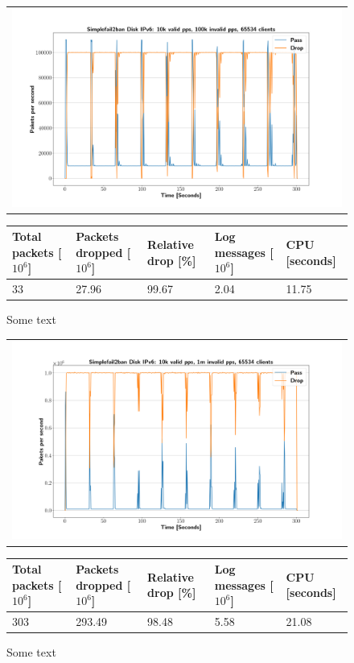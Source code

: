 \begin{figure}[p]
	\label{fig:simplefail2ban:disk:ip6:100k}
	\centering
	\scriptsize
	\begin{tabular}{c}
    	\centerline{\includegraphics[width=1.2\textwidth]{images/simplefail2ban_disk_ipv6_v10k_iv100k_c65534.png}}
	\end{tabular}
	\begin{tabular}{lllll}
		\toprule
		\textbf{Total packets [$10^6$]} & \textbf{Packets dropped [$10^6$]} & \textbf{Relative drop [\%]} & \textbf{Log messages [$10^6$]} & \textbf{CPU [seconds]} \\ \midrule 
		33 & 27.96 & 99.67 & 2.04 & 11.75 \\
		\bottomrule
	\end{tabular}
	\caption[Simplefail2ban Logfile IPv6 100k PPS]{Some text}
\end{figure}

\begin{figure}[p]
	\label{fig:simplefail2ban:disk:ip6:1m}
	\centering
	\scriptsize
	\begin{tabular}{c}
    	\centerline{\includegraphics[width=1.2\textwidth]{images/simplefail2ban_disk_ipv6_v10k_iv1m_c65534.png}}
	\end{tabular}
	\begin{tabular}{lllll}
		\toprule
		\textbf{Total packets [$10^6$]} & \textbf{Packets dropped [$10^6$]} & \textbf{Relative drop [\%]} & \textbf{Log messages [$10^6$]} & \textbf{CPU [seconds]} \\ \midrule 
		303 & 293.49 & 98.48 & 5.58 & 21.08 \\
		\bottomrule
	\end{tabular}
	\caption[Simplefail2ban Logfile IPv6 1m PPS]{Some text}
\end{figure}

